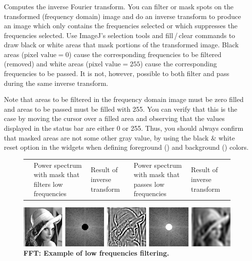 \subsubsection{\protect{}}

Computes the inverse Fourier transform. You can filter or mask spots
on the transformed (frequency domain) image and do an inverse transform
to produce an image which only contains the frequencies selected or
which suppresses the frequencies selected. Use ImageJ's selection
tools and fill\,/\,clear commands to draw black or white areas that
mask portions of the transformed image. Black areas ($\mbox{pixel value}=0$)
cause the corresponding frequencies to be filtered (removed) and white
areas ($\mbox{pixel value}=255$) cause the corresponding frequencies
to be passed. It is not, however, possible to both filter and pass
during the same inverse transform. 

Note that areas to be filtered in the frequency domain image must
be zero filled and areas to be passed must be filled with 255. You
can verify that this is the case by moving the cursor over a filled
area and observing that the values displayed in the status bar are
either 0 or 255. Thus, you should always confirm that masked areas
are not some other gray value, by using the black \& white reset option
in the  widgets when defining foreground ()
and background ()
colors.

\begin{figure}[h]
\noindent \setlength{\tabcolsep}{0pt}%
\begin{tabular}{>{\centering}m{}>{\centering}m{}>{\centering}m{}>{\centering}m{}>{\centering}m{}}
{\footnotesize Original} & {\footnotesize Power spectrum with mask that filters low frequencies} & {\footnotesize Result of inverse transform} & {\footnotesize Power spectrum with mask that passes low frequencies} & {\footnotesize Result of inverse transform}\tabularnewline
\end{tabular}

\noindent \includegraphics[width=1\columnwidth]{images/FFTlena}\caption{\textbf{FFT: Example of low frequencies filtering.}}
\end{figure}


